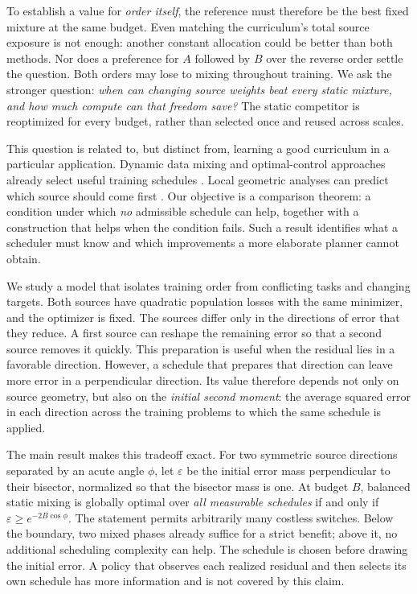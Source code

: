 \documentclass{article}
\theoremstyle{remark}\newtheorem{remark}[theorem]{Remark}
\begin{document}
To establish a value for \emph{order itself}, the reference must therefore be the best fixed mixture at the same budget. Even matching the curriculum's total source exposure is not enough: another constant allocation could be better than both methods. Nor does a preference for $A$ followed by $B$ over the reverse order settle the question. Both orders may lose to mixing throughout training. We ask the stronger question: \emph{when can changing source weights beat every static mixture, and how much compute can that freedom save?} The static competitor is reoptimized for every budget, rather than selected once and reused across scales.

This question is related to, but distinct from, learning a good curriculum in a particular application. Dynamic data mixing and optimal-control approaches already select useful training schedules \citep{chen2025,gu2025,mori2025,zhao2026}. Local geometric analyses can predict which source should come first \citep{sweeney2026}. Our objective is a comparison theorem: a condition under which \emph{no} admissible schedule can help, together with a construction that helps when the condition fails. Such a result identifies what a scheduler must know and which improvements a more elaborate planner cannot obtain.

We study a model that isolates training order from conflicting tasks and changing targets. Both sources have quadratic population losses with the same minimizer, and the optimizer is fixed. The sources differ only in the directions of error that they reduce. A first source can reshape the remaining error so that a second source removes it quickly. This preparation is useful when the residual lies in a favorable direction. However, a schedule that prepares that direction can leave more error in a perpendicular direction. Its value therefore depends not only on source geometry, but also on the \emph{initial second moment}: the average squared error in each direction across the training problems to which the same schedule is applied.

The main result makes this tradeoff exact. For two symmetric source directions separated by an acute angle $\phi$, let $\varepsilon$ be the initial error mass perpendicular to their bisector, normalized so that the bisector mass is one. At budget $B$, balanced static mixing is globally optimal over \emph{all measurable schedules} if and only if $\varepsilon\ge e^{-2B\cos\phi}$. The statement permits arbitrarily many costless switches. Below the boundary, two mixed phases already suffice for a strict benefit; above it, no additional scheduling complexity can help. The schedule is chosen before drawing the initial error. A policy that observes each realized residual and then selects its own schedule has more information and is not covered by this claim.
\end{document}

